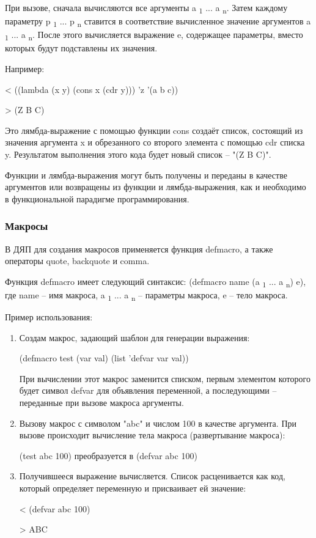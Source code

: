 При вызове, сначала вычисляются все аргументы a \textsubscript 1 ... a \textsubscript n. Затем каждому параметру p \textsubscript 1 ... p \textsubscript n ставится в соответствие вычисленное значение аргументов a \textsubscript 1 ... a \textsubscript n. После этого вычисляется выражение e, содержащее параметры, вместо которых будут подставлены их значения.

Например:

< ((lambda (x y) (cons x (cdr y))) 'z '(a b c))

> (Z B C)

Это лямбда-выражение с помощью функции cons создаёт список, состоящий из значения аргумента x и обрезанного со второго элемента с помощью cdr списка y. Результатом выполнения этого кода будет новый список -- "(Z B C)".

Функции и лямбда-выражения могут быть получены и переданы в качестве аргументов или возвращены из функции и лямбда-выражения, как и необходимо в функциональной парадигме программирования.



\subsubsection{Макросы}

В ДЯП для создания макросов применяется функция defmacro, а также операторы quote, backquote и comma.

Функция defmacro имеет следующий синтаксис:
(defmacro name (a \textsubscript 1 ... a \textsubscript n) e), где name -- имя макроса, a \textsubscript 1 ... a \textsubscript n -- параметры макроса, e -- тело макроса.

Пример использования:

\begin{enumerate}
	\item Создам макрос, задающий шаблон для генерации выражения:
	
	(defmacro test (var val) (list 'defvar var val))
	
	При вычислении этот макрос заменится списком, первым элементом которого будет символ defvar для объявления переменной, а последующими -- переданные при вызове макроса аргументы.
	
	\item Вызову макрос с символом "abc" и числом 100 в качестве аргумента. При вызове происходит вычисление тела макроса (развертывание макроса):
	
	(test abc 100) преобразуется в (defvar abc 100)
	
	\item Получившееся выражение вычисляется. Список расценивается как код, который определяет переменную и присваивает ей значение:
	
	< (defvar abc 100)
	
	> ABC
\end{enumerate}

